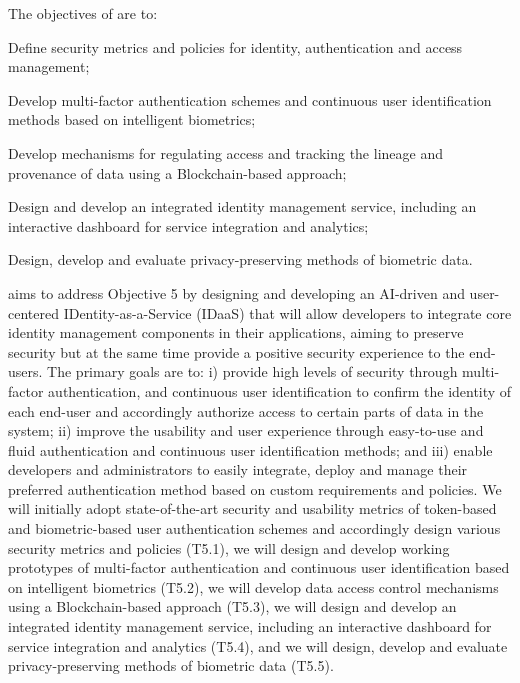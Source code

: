 \addtocounter{wpno}{1}
\begin{Workpackage}{\thewpno}
\WPTitle{\wpname{\thewpno}}

\begin{WPObjectives}
The objectives of \theWP{} are to:
\begin{compactitem}
\item Define security metrics and policies for identity, authentication and access management;
\item Develop multi-factor authentication schemes and continuous user identification methods based on intelligent biometrics;
\item Develop mechanisms for regulating access and tracking the lineage and provenance of data using a Blockchain-based approach;
\item Design and develop an integrated identity management service, including an interactive dashboard for service integration and analytics;
\item Design, develop and evaluate privacy-preserving methods of biometric data.
\end{compactitem}
\end{WPObjectives}

\begin{WPDescription}
\theWP{} aims to address Objective 5 by designing and developing an AI-driven and user-centered IDentity-as-a-Service (IDaaS) that will allow developers to integrate core identity management components in their applications, aiming to preserve security but at the same time provide a positive security experience to the end-users. The primary goals are to: i) provide high levels of security through multi-factor authentication, and continuous user identification to confirm the identity of each end-user and accordingly authorize access to certain parts of data in the system; ii) improve the usability and user experience through easy-to-use and fluid authentication and continuous user identification methods; and iii) enable developers and administrators to easily integrate, deploy and manage their preferred authentication method based on custom requirements and policies. We will initially adopt state-of-the-art security and usability metrics of token-based and biometric-based user authentication schemes and accordingly design various security metrics and policies (T5.1), we will design and develop working prototypes of multi-factor authentication and continuous user identification based on intelligent biometrics (T5.2), we will develop data access control mechanisms using a Blockchain-based approach (T5.3), we will design and develop an integrated identity management service, including an interactive dashboard for service integration and analytics (T5.4), and we will design, develop and evaluate privacy-preserving methods of biometric data (T5.5).


\end{WPDescription}
\end{Workpackage}
